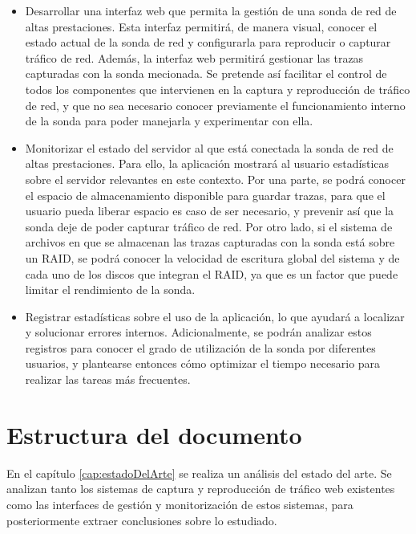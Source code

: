 \begin{itemize}
  \item Desarrollar una interfaz web que permita la gestión de una sonda de red de altas prestaciones.
  Esta interfaz permitirá, de manera visual, conocer el estado actual de la sonda de red y configurarla para reproducir o capturar tráfico de red.
  Además, la interfaz web permitirá gestionar las \glspl{traza} capturadas con la sonda mecionada.
  Se pretende así facilitar el control de todos los componentes que intervienen en la captura y reproducción de tráfico de red, y que no sea necesario conocer previamente el funcionamiento interno de la sonda para poder manejarla y experimentar con ella.

  \item Monitorizar el estado del servidor al que está conectada la sonda de red de altas prestaciones.
  Para ello, la aplicación mostrará al usuario estadísticas sobre el servidor relevantes en este contexto.
  Por una parte, se podrá conocer el espacio de almacenamiento disponible para guardar \glspl{traza}, para que el usuario pueda liberar espacio es caso de ser necesario, y prevenir así que la sonda deje de poder capturar tráfico de red.
  Por otro lado, si el sistema de archivos en que se almacenan las \glspl{traza} capturadas con la sonda está sobre un \gls{RAID}, se podrá conocer la velocidad de escritura global del sistema y de cada uno de los discos que integran el \gls{RAID}, ya que es un factor que puede limitar el rendimiento de la sonda.

  \item Registrar estadísticas sobre el uso de la aplicación, lo que ayudará a localizar y solucionar errores internos.
  Adicionalmente, se podrán analizar estos registros para conocer el grado de utilización de la sonda por diferentes usuarios, y plantearse entonces cómo optimizar el tiempo necesario para realizar las tareas más frecuentes.
\end{itemize}

\section{Estructura del documento}

En el capítulo \ref{cap:estadoDelArte} se realiza un análisis del estado del arte. Se analizan tanto los sistemas de captura y reproducción de tráfico web existentes como las interfaces de gestión y monitorización de estos sistemas, para posteriormente extraer conclusiones sobre lo estudiado.

